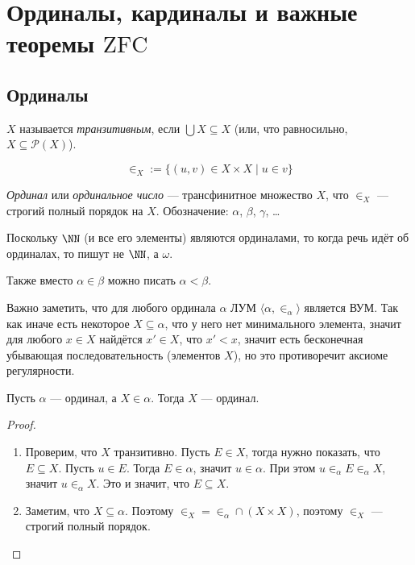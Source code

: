 \documentclass[12pt,a4paper]{article}
\newcommand{\subsets}{\ensuremath{\mathcal{P}}\xspace}
\newcommand{\ZFC}{\ensuremath{\mathrm{ZFC}}\xspace}
\begin{document}
    \section{Ординалы, кардиналы и важные теоремы \ZFC}

    \subsection{Ординалы}

    \begin{definition}
        $X$ называется \emph{транзитивным}, если $\bigcup X \subseteq X$ (или, что равносильно, $X \subseteq \subsets(X)$).
    \end{definition}

    \begin{definition}
        \[{\in}_X := \{(u, v) \in X \times X \mid u \in v\}\]
    \end{definition}

    \begin{definition}
        \emph{Ординал} или \emph{ординальное число} --- трансфинитное множество $X$, что $\in_X$ --- строгий полный порядок на $X$. Обозначение: $\alpha$, $\beta$, $\gamma$, \dots

        Поскольку $\NN$ (и все его элементы) являются ординалами, то когда речь идёт об ординалах, то пишут не $\NN$, а $\omega$.

        Также вместо $\alpha \in \beta$ можно писать $\alpha < \beta$.
    \end{definition}

    \begin{remark}
        Важно заметить, что для любого ординала $\alpha$ ЛУМ $\langle \alpha, {\in}_\alpha \rangle$ является ВУМ. Так как иначе есть некоторое $X\subseteq \alpha$, что у него нет минимального элемента, значит для любого $x \in X$ найдётся $x' \in X$, что $x' < x$, значит есть бесконечная убывающая последовательность (элементов $X$), но это противоречит аксиоме регулярности.
    \end{remark}

    \begin{statement}
        Пусть $\alpha$ --- ординал, а $X \in \alpha$. Тогда $X$ --- ординал.
    \end{statement}

    \begin{proof}
        \begin{enumerate}
            \item Проверим, что $X$ транзитивно. Пусть $E \in X$, тогда нужно показать, что $E \subseteq X$. Пусть $u \in E$. Тогда $E \in \alpha$, значит $u \in \alpha$. При этом $u \in_\alpha E \in_\alpha X$, значит $u \in_\alpha X$. Это и значит, что $E \subseteq X$.
            \item Заметим, что $X \subseteq \alpha$. Поэтому ${\in}_X = {\in}_\alpha \cap (X \times X)$, поэтому $\in_X$ --- строгий полный порядок.
        \end{enumerate}
    \end{proof}
\end{document}
